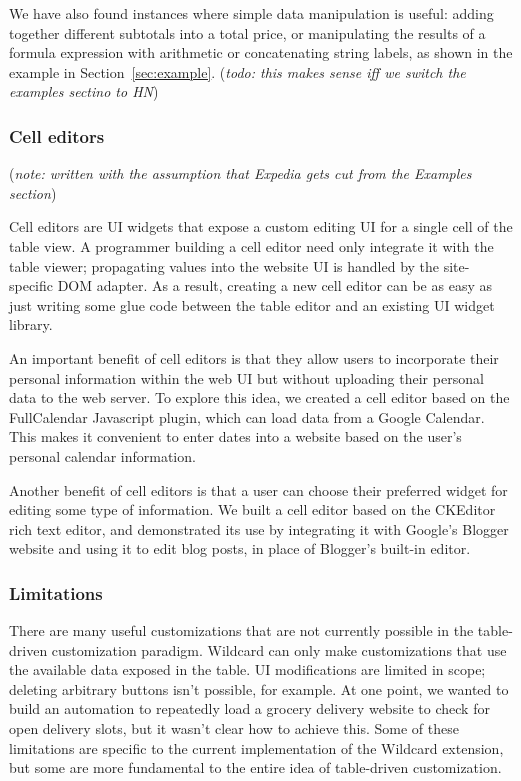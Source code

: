 \documentclass[sigplan,screen,10pt,anonymous,review]{acmart}
\begin{document}
We have also found instances where simple data manipulation is useful:
adding together different subtotals into a total price, or manipulating
the results of a formula expression with arithmetic or concatenating
string labels, as shown in the example in Section~\ref{sec:example}.
(\emph{todo: this makes sense iff we switch the examples sectino to HN})

\hypertarget{cell-editors}{%
\subsubsection{Cell editors}\label{cell-editors}}

(\emph{note: written with the assumption that Expedia gets cut from the
Examples section})

Cell editors are UI widgets that expose a custom editing UI for a single
cell of the table view. A programmer building a cell editor need only
integrate it with the table viewer; propagating values into the website
UI is handled by the site-specific DOM adapter. As a result, creating a
new cell editor can be as easy as just writing some glue code between
the table editor and an existing UI widget library.

An important benefit of cell editors is that they allow users to
incorporate their personal information within the web UI but without
uploading their personal data to the web server. To explore this idea,
we created a cell editor based on the FullCalendar Javascript plugin,
which can load data from a Google Calendar. This makes it convenient to
enter dates into a website based on the user's personal calendar
information.

Another benefit of cell editors is that a user can choose their
preferred widget for editing some type of information. We built a cell
editor based on the CKEditor rich text editor, and demonstrated its use
by integrating it with Google's Blogger website and using it to edit
blog posts, in place of Blogger's built-in editor.

\hypertarget{limitations}{%
\subsubsection{Limitations}\label{limitations}}

There are many useful customizations that are not currently possible in
the table-driven customization paradigm. Wildcard can only make
customizations that use the available data exposed in the table. UI
modifications are limited in scope; deleting arbitrary buttons isn't
possible, for example. At one point, we wanted to build an automation to
repeatedly load a grocery delivery website to check for open delivery
slots, but it wasn't clear how to achieve this. Some of these
limitations are specific to the current implementation of the Wildcard
extension, but some are more fundamental to the entire idea of
table-driven customization.
\end{document}
